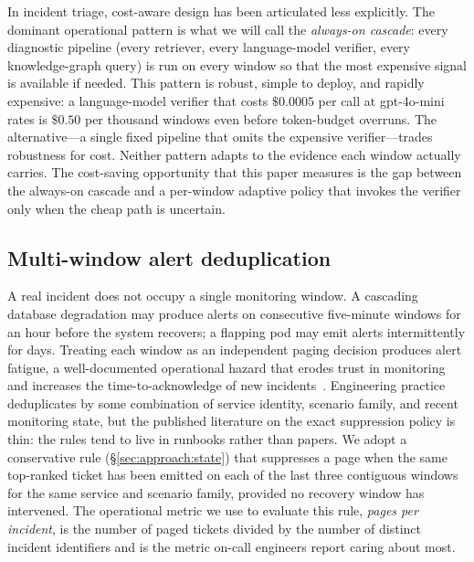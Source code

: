 In incident triage, cost-aware design has been articulated less explicitly. The dominant operational pattern is what we will call the \emph{always-on cascade}: every diagnostic pipeline (every retriever, every language-model verifier, every knowledge-graph query) is run on every window so that the most expensive signal is available if needed. This pattern is robust, simple to deploy, and rapidly expensive: a language-model verifier that costs $\$0.0005$ per call at gpt-4o-mini rates is $\$0.50$ per thousand windows even before token-budget overruns. The alternative---a single fixed pipeline that omits the expensive verifier---trades robustness for cost. Neither pattern adapts to the evidence each window actually carries. The cost-saving opportunity that this paper measures is the gap between the always-on cascade and a per-window adaptive policy that invokes the verifier only when the cheap path is uncertain.

\subsection{Multi-window alert deduplication}
\label{sec:background:suppression}

A real incident does not occupy a single monitoring window. A cascading database degradation may produce alerts on consecutive five-minute windows for an hour before the system recovers; a flapping pod may emit alerts intermittently for days. Treating each window as an independent paging decision produces alert fatigue, a well-documented operational hazard that erodes trust in monitoring and increases the time-to-acknowledge of new incidents~\cite{notaro2021aiops}. Engineering practice deduplicates by some combination of service identity, scenario family, and recent monitoring state, but the published literature on the exact suppression policy is thin: the rules tend to live in runbooks rather than papers. We adopt a conservative rule (\S\ref{sec:approach:state}) that suppresses a page when the same top-ranked ticket has been emitted on each of the last three contiguous windows for the same service and scenario family, provided no recovery window has intervened. The operational metric we use to evaluate this rule, \emph{pages per incident}, is the number of paged tickets divided by the number of distinct incident identifiers and is the metric on-call engineers report caring about most.
